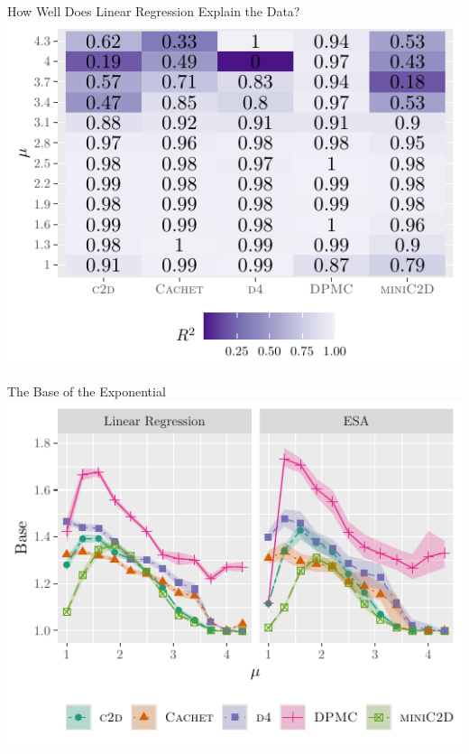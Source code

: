 \documentclass{beamer}
\begin{document}
\begin{frame}{How Well Does Linear Regression Explain the Data?}
  \centering
  \includegraphics{r2.pdf}
\end{frame}

\begin{frame}{The Base of the Exponential}
  \centering
  \includegraphics{linearbase2.pdf}
\end{frame}
\end{document}

